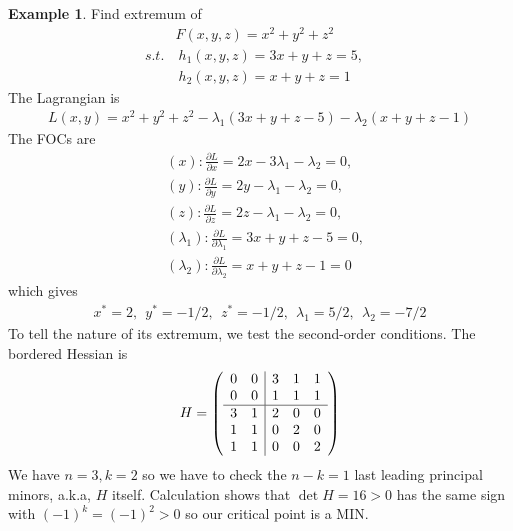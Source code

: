 \documentclass[10pt,a4paper]{book}
\theoremstyle{definition}\newtheorem{definition}{Definition}
\theoremstyle{definition}\newtheorem{fact}{Fact}
\theoremstyle{definition}\newtheorem{ex}{Ex.}
\theoremstyle{definition}\newtheorem{project}{Project}
\theoremstyle{definition}\newtheorem{problem}{Problem}
\theoremstyle{definition}\newtheorem{example}{Example}
\numberwithin{theorem}{chapter}
\numberwithin{corollary}{chapter}
\numberwithin{assumption}{chapter}
\numberwithin{definition}{chapter}
\numberwithin{prop}{chapter}
\numberwithin{notation}{chapter}
\numberwithin{problem}{chapter}
\numberwithin{example}{chapter}
\numberwithin{fact}{chapter}
\numberwithin{ex}{chapter}
\begin{document}
	\begin{example}
		Find extremum of
		\begin{align*}
			& F(x,y,z) = x^2 + y^2 + z^2     \\
			s.t. &\ h_1(x,y,z) = 3x + y + z = 5, &                                \\
			& \  h_2 (x,y,z) = x + y + z = 1 
		\end{align*}
		The Lagrangian is
		\begin{align*}
			L(x,y) = x^2 + y^2 + z^2 - \lambda_1 (3x + y + z - 5) - \lambda_2 (x + y +z - 1) 
		\end{align*}
		The FOCs are
		\begin{align*}
			& (x): \frac{\partial L}{\partial x} = 2x - 3 \lambda_1 - \lambda_2  = 0,  \\
			& (y): \frac{\partial L}{\partial y} = 2y - \lambda_1 - \lambda_2 = 0,     \\
			& (z): \frac{\partial L}{\partial z} = 2z - \lambda_1 - \lambda_2 = 0,     \\
			& (\lambda_1): \frac{\partial L}{\partial \lambda_1} = 3x + y + z - 5 = 0, \\
			& (\lambda_2): \frac{\partial L}{\partial \lambda_2} = x + y +z - 1 = 0    
		\end{align*}
		which gives
		\begin{align*}
			x^* = 2, \ \ y^* = - 1/2, \ \ z^* = -1/2, \ \ \lambda_1 = 5/2, \ \ \lambda_2 = -7/2 
		\end{align*}
		To tell the nature of its extremum, we test the second-order conditions. The bordered Hessian is
		\begin{align*}
			H = \left( \begin{array}{c | c}
				\begin{matrix}
					0 & 0 \\
					0 & 0 
				\end{matrix} & \begin{matrix}
					3 & 1 & 1 \\
					1 & 1 & 1 
				\end{matrix} \\
				\hline
				\begin{matrix}
					3 & 1  \\
					1 & 1  \\
					1 & 1 
				\end{matrix} & \begin{matrix}
					2 & 0 & 0 \\
					0 & 2 & 0 \\
					0 & 0 & 2 
				\end{matrix}
			\end{array} \right)
		\end{align*}
		We have $n=3, k=2$ so we have to check the $n-k=1$ last leading principal minors, a.k.a, $H$ itself. Calculation shows that $\det H = 16 > 0$ has the same sign with $(-1)^k = (-1)^2 > 0$ so our critical point is a MIN. 
	\end{example}
	
\end{document}
